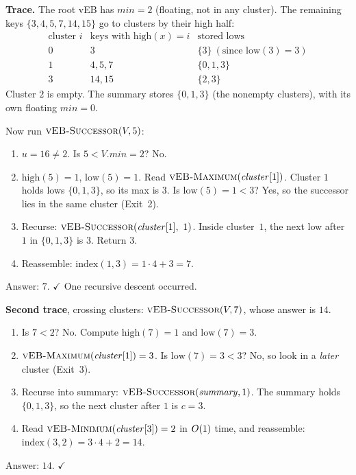 \begin{labbox}
\textbf{Trace.} The root vEB has $\mathit{min}=2$ (floating, not in any cluster).
The remaining keys $\{3,4,5,7,14,15\}$ go to clusters by their high
half:
\[
\begin{array}{c|l|l}
\text{cluster } i & \text{keys with }\mathrm{high}(x)=i & \text{stored lows} \\\hline
0 & 3 & \{3\}\ (\text{since } \mathrm{low}(3)=3)\\
1 & 4,5,7 & \{0,1,3\}\\
3 & 14,15 & \{2,3\}
\end{array}
\]
Cluster $2$ is empty. The summary stores $\{0,1,3\}$ (the nonempty clusters),
with its own floating $\mathit{min}=0$.

Now run $\textsc{vEB-Successor}(V, 5)$:
\begin{enumerate}
  \item $u=16 \ne 2$. Is $5 < V.\mathit{min}=2$? No.
  \item $\mathrm{high}(5)=1$, $\mathrm{low}(5)=1$. Read
        $\textsc{vEB-Maximum}(\mathit{cluster}[1])$. Cluster $1$ holds lows
        $\{0,1,3\}$, so its max is $3$. Is $\mathrm{low}(5)=1 < 3$? Yes, so
        the successor lies in the same cluster (Exit~2).
  \item Recurse: $\textsc{vEB-Successor}(\mathit{cluster}[1],\ 1)$. Inside cluster~$1$,
        the next low after $1$ in $\{0,1,3\}$ is $3$. Return $3$.
  \item Reassemble: $\mathrm{index}(1, 3) = 1\cdot 4 + 3 = 7$.
\end{enumerate}
Answer: $7$. $\checkmark$ One recursive descent occurred.

\textbf{Second trace}, crossing clusters: $\textsc{vEB-Successor}(V, 7)$, whose answer
is $14$.
\begin{enumerate}
  \item Is $7 < 2$? No. Compute $\mathrm{high}(7)=1$ and $\mathrm{low}(7)=3$.
  \item $\textsc{vEB-Maximum}(\mathit{cluster}[1]) = 3$. Is $\mathrm{low}(7)=3 < 3$?
        No, so look in a \emph{later} cluster (Exit~3).
  \item Recurse into summary: $\textsc{vEB-Successor}(\mathit{summary}, 1)$.
        The summary holds $\{0,1,3\}$, so the next cluster after $1$ is $c=3$.
  \item Read $\textsc{vEB-Minimum}(\mathit{cluster}[3]) = 2$ in $O(1)$ time, and reassemble:
        $\mathrm{index}(3, 2) = 3\cdot 4 + 2 = 14$.
\end{enumerate}
Answer: $14$. $\checkmark$
\end{labbox}

